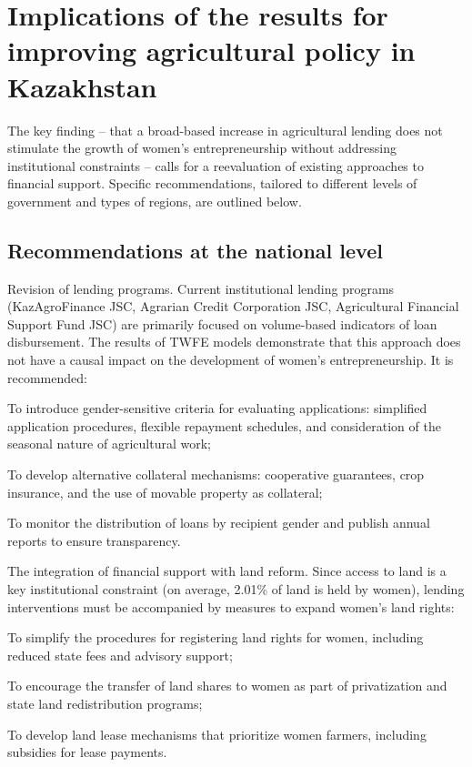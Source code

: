﻿\documentclass[pdflatex,sn-mathphys-ay]{sn-jnl}
\begin{document}
\section{Implications of the results for improving agricultural policy in Kazakhstan}

The key finding -- that a broad-based increase in agricultural lending
does not stimulate the growth of women's entrepreneurship without
addressing institutional constraints -- calls for a reevaluation of
existing approaches to financial support. Specific recommendations,
tailored to different levels of government and types of regions, are
outlined below.

\subsection{Recommendations at the national level}

Revision of lending programs. Current institutional lending programs
(KazAgroFinance JSC, Agrarian Credit Corporation JSC, Agricultural
Financial Support Fund JSC) are primarily focused on volume-based
indicators of loan disbursement. The results of TWFE models demonstrate
that this approach does not have a causal impact on the development of
women's entrepreneurship. It is recommended:

To introduce gender-sensitive criteria for evaluating applications:
simplified application procedures, flexible repayment schedules, and
consideration of the seasonal nature of agricultural work;

To develop alternative collateral mechanisms: cooperative guarantees,
crop insurance, and the use of movable property as collateral;

To monitor the distribution of loans by recipient gender and publish
annual reports to ensure transparency.

The integration of financial support with land reform. Since access to
land is a key institutional constraint (on average, 2.01\% of land is
held by women), lending interventions must be accompanied by measures to
expand women's land rights:

To simplify the procedures for registering land rights for women,
including reduced state fees and advisory support;

To encourage the transfer of land shares to women as part of
privatization and state land redistribution programs;

To develop land lease mechanisms that prioritize women farmers,
including subsidies for lease payments.
\end{document}
